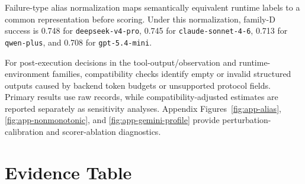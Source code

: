 \documentclass[11pt]{article}
\begin{document}
Failure-type alias normalization maps semantically equivalent runtime labels to a common representation before scoring. Under this normalization, family-D success is 0.748 for \texttt{deepseek-v4-pro}, 0.745 for \texttt{claude-sonnet-4-6}, 0.713 for \texttt{qwen-plus}, and 0.708 for \texttt{gpt-5.4-mini}.

For post-execution decisions in the tool-output/observation and runtime-environment families, compatibility checks identify empty or invalid structured outputs caused by backend token budgets or unsupported protocol fields. Primary results use raw records, while compatibility-adjusted estimates are reported separately as sensitivity analyses. Appendix Figures~\ref{fig:app-alias}, \ref{fig:app-nonmonotonic}, and \ref{fig:app-gemini-profile} provide perturbation-calibration and scorer-ablation diagnostics.

\section{Evidence Table}
\label{app:evidence}
\end{document}
